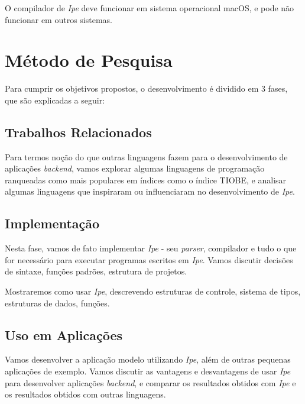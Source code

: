 O compilador de \textit{Ipe} deve funcionar em sistema operacional macOS, e pode
não funcionar em outros sistemas.

\section{Método de Pesquisa}

Para cumprir os objetivos propostos, o desenvolvimento é dividido em 3 fases, que
são explicadas a seguir:

\subsection{Trabalhos Relacionados}

Para termos noção do que outras linguagens fazem para o desenvolvimento de
aplicações \textit{backend}, vamos explorar algumas linguagens de programação
ranqueadas como mais populares em índices como o índice TIOBE, e analisar algumas
linguagens que inspiraram ou influenciaram no desenvolvimento de \textit{Ipe}.

\subsection{Implementação}

Nesta fase, vamos de fato implementar \textit{Ipe} - seu \textit{parser}, compilador
e tudo o que for necessário para executar programas escritos em \textit{Ipe}.
Vamos discutir decisões de sintaxe, funções padrões, estrutura de projetos.

Mostraremos como usar \textit{Ipe}, descrevendo estruturas de controle, sistema
de tipos, estruturas de dados, funções.

\subsection{Uso em Aplicações}

Vamos desenvolver a aplicação modelo utilizando \textit{Ipe}, além de outras
pequenas aplicações de exemplo. Vamos discutir as vantagens e desvantagens de
usar \textit{Ipe} para desenvolver aplicações \textit{backend}, e comparar os
resultados obtidos com \textit{Ipe} e os resultados obtidos com outras linguagens.
